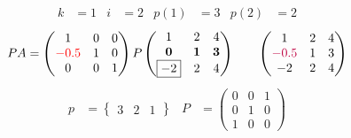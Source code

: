 \documentclass[pdf]{beamer}
\begin{document}
\begin{frame}{}\begin{align*} k &= 1 & i &= 2 & p(1) &= 3 & p(2) &= 2\end{align*}$$PA=\begin{pmatrix}1&0&0\\{\color{red}-0.5}&1&0\\0&0&1\end{pmatrix} P \begin{pmatrix}1&2&4\\\mathbf{0}&\mathbf{1}&\mathbf{3}\\\boxed{-2}&2&4\end{pmatrix} \quad\quad \begin{pmatrix}1&2&4\\{\color{purple}-0.5}&1&3\\-2&2&4\end{pmatrix}$$\begin{align*} p&= \begin{Bmatrix}3&2&1\end{Bmatrix} & P&= \begin{pmatrix}0&0&1\\0&1&0\\1&0&0\end{pmatrix} \end{align*}\end{frame}
\end{document}
